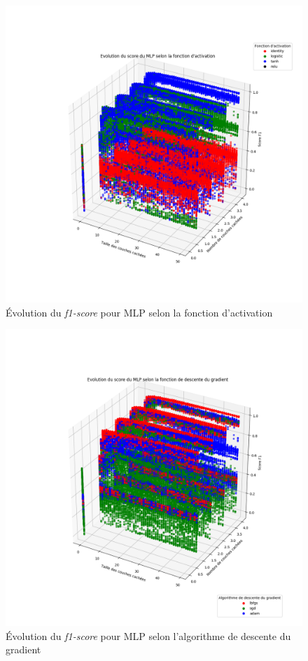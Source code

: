 \documentclass[a4paper]{report}
\begin{document}
\begin{figure}
\centering
\includegraphics[width=\textwidth]{img/mlp_activation.png}
\caption{Évolution du \emph{f1-score} pour MLP selon la fonction d'activation\label{mlp_activation}}
\end{figure}

\begin{figure}
\centering
\includegraphics[width=\textwidth]{img/mlp_solver.png}
\caption{Évolution du \emph{f1-score} pour MLP selon l'algorithme de descente du gradient\label{mlp_solver}}
\end{figure}
\end{document}
